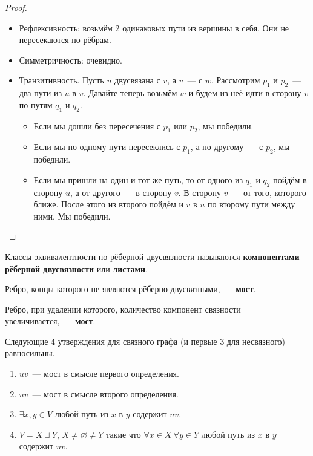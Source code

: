 \documentclass{article}
\begin{document}
    \begin{proof}
        \begin{itemize}
            \item Рефлексивность: возьмём 2 одинаковых пути из вершины в себя. Они не пересекаются по рёбрам.
            \item Симметричность: очевидно.
            \item Транзитивность. Пусть $u$ двусвязана с $v$, а $v$~--- с $w$. Рассмотрим $p_1$ и $p_2$~--- два пути из $u$ в $v$. Давайте теперь возьмём $w$ и будем из неё идти в сторону $v$ по путям $q_1$ и $q_2$.
            \begin{itemize}
                \item Если мы дошли без пересечения с $p_1$ или $p_2$, мы победили.
                \item Если мы по одному пути пересеклись с $p_1$, а по другому~--- с $p_2$, мы победили.
                \item Если мы пришли на один и тот же путь, то от одного из $q_1$ и $q_2$ пойдём в сторону $u$, а от другого~--- в сторону $v$. В сторону $v$~--- от того, которого ближе. После этого из второго пойдём и $v$ в $u$ по второму пути между ними. Мы победили.
            \end{itemize}
        \end{itemize}
    \end{proof}
    \begin{definition}
        Классы эквивалентности по рёберной двусвязности называются \textbf{компонентами рёберной двусвязности} или \textbf{листами}.
    \end{definition}
    \begin{definition}
        Ребро, концы которого не являются рёберно двусвязными,~--- \textbf{мост}.
    \end{definition}
    \begin{definition}
        Ребро, при удалении которого, количество компонент связности увеличивается,~--- \textbf{мост}.
    \end{definition}
    \begin{theorem}
        Следующие 4 утверждения для связного графа (и первые 3 для несвязного) равносильны.
        \begin{enumerate}
            \item $uv$~--- мост в смысле первого определения.
            \item $uv$~--- мост в смысле второго определения.
            \item $\exists x,y\in V$ любой путь из $x$ в $y$ содержит $uv$.
            \item $V=X\sqcup Y$, $X\neq\varnothing\neq Y$ такие что $\forall x\in X~\forall y\in Y$ любой путь из $x$ в $y$ содержит $uv$.
        \end{enumerate}
    \end{theorem}
\end{document}
